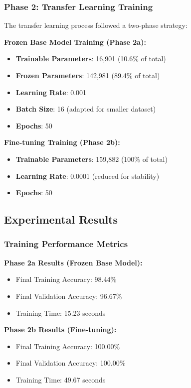\documentclass[12pt,a4paper]{article}
\begin{document}
\subsubsection{Phase 2: Transfer Learning Training}

The transfer learning process followed a two-phase strategy:

\textbf{Frozen Base Model Training (Phase 2a):}
\begin{itemize}
    \item \textbf{Trainable Parameters}: 16,901 (10.6\% of total)
    \item \textbf{Frozen Parameters}: 142,981 (89.4\% of total)
    \item \textbf{Learning Rate}: 0.001
    \item \textbf{Batch Size}: 16 (adapted for smaller dataset)
    \item \textbf{Epochs}: 50
\end{itemize}

\textbf{Fine-tuning Training (Phase 2b):}
\begin{itemize}
    \item \textbf{Trainable Parameters}: 159,882 (100\% of total)
    \item \textbf{Learning Rate}: 0.0001 (reduced for stability)
    \item \textbf{Epochs}: 50
\end{itemize}

\subsection{Experimental Results}

\subsubsection{Training Performance Metrics}

\textbf{Phase 2a Results (Frozen Base Model):}
\begin{itemize}
    \item Final Training Accuracy: 98.44\%
    \item Final Validation Accuracy: 96.67\%
    \item Training Time: 15.23 seconds
\end{itemize}

\textbf{Phase 2b Results (Fine-tuning):}
\begin{itemize}
    \item Final Training Accuracy: 100.00\%
    \item Final Validation Accuracy: 100.00\%
    \item Training Time: 49.67 seconds
\end{itemize}
\end{document}
